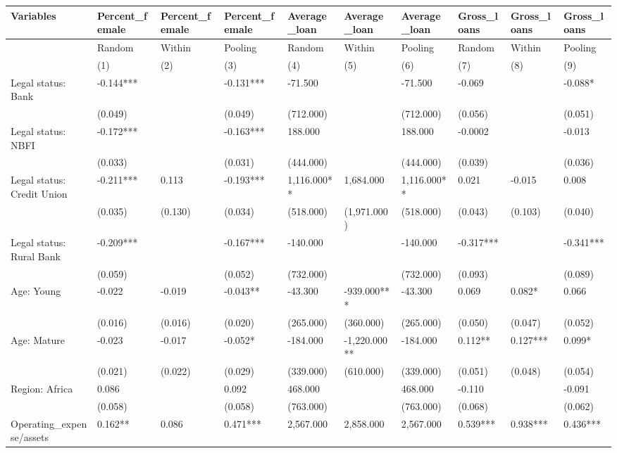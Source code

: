 \documentclass[
]{article}
\begin{document}
\begin{tabular}{l|l|l|l|l|l|l|l|l|l}
\hline
Variables & Percent\_female & Percent\_female & Percent\_female & Average\_loan & Average\_loan & Average\_loan & Gross\_loans & Gross\_loans & Gross\_loans\\
\hline
 & Random & Within & Pooling & Random & Within & Pooling & Random & Within & Pooling\\
\hline
 & (1) & (2) & (3) & (4) & (5) & (6) & (7) & (8) & (9)\\
\hline
Legal status: Bank & -0.144*** &  & -0.131*** & -71.500 &  & -71.500 & -0.069 &  & -0.088*\\
\hline
 & (0.049) &  & (0.049) & (712.000) &  & (712.000) & (0.056) &  & (0.051)\\
\hline
Legal status: NBFI & -0.172*** &  & -0.163*** & 188.000 &  & 188.000 & -0.0002 &  & -0.013\\
\hline
 & (0.033) &  & (0.031) & (444.000) &  & (444.000) & (0.039) &  & (0.036)\\
\hline
Legal status: Credit Union & -0.211*** & 0.113 & -0.193*** & 1,116.000** & 1,684.000 & 1,116.000** & 0.021 & -0.015 & 0.008\\
\hline
 & (0.035) & (0.130) & (0.034) & (518.000) & (1,971.000) & (518.000) & (0.043) & (0.103) & (0.040)\\
\hline
Legal status: Rural Bank & -0.209*** &  & -0.167*** & -140.000 &  & -140.000 & -0.317*** &  & -0.341***\\
\hline
 & (0.059) &  & (0.052) & (732.000) &  & (732.000) & (0.093) &  & (0.089)\\
\hline
Age: Young & -0.022 & -0.019 & -0.043** & -43.300 & -939.000*** & -43.300 & 0.069 & 0.082* & 0.066\\
\hline
 & (0.016) & (0.016) & (0.020) & (265.000) & (360.000) & (265.000) & (0.050) & (0.047) & (0.052)\\
\hline
Age: Mature & -0.023 & -0.017 & -0.052* & -184.000 & -1,220.000** & -184.000 & 0.112** & 0.127*** & 0.099*\\
\hline
 & (0.021) & (0.022) & (0.029) & (339.000) & (610.000) & (339.000) & (0.051) & (0.048) & (0.054)\\
\hline
Region: Africa & 0.086 &  & 0.092 & 468.000 &  & 468.000 & -0.110 &  & -0.091\\
\hline
 & (0.058) &  & (0.058) & (763.000) &  & (763.000) & (0.068) &  & (0.062)\\
\hline
Operating\_expense/assets & 0.162** & 0.086 & 0.471*** & 2,567.000 & 2,858.000 & 2,567.000 & 0.539*** & 0.938*** & 0.436***\\

\end{tabular}
\end{document}

